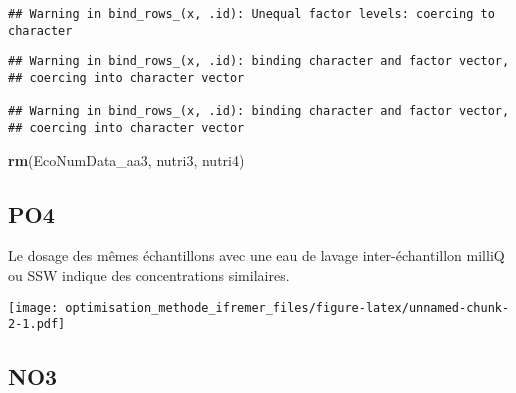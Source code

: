 \documentclass[]{article}
\newenvironment{Shaded}{\begin{snugshade}}{\end{snugshade}}
\newcommand{\KeywordTok}[1]{\textcolor[rgb]{0.13,0.29,0.53}{\textbf{#1}}}
\newcommand{\DataTypeTok}[1]{\textcolor[rgb]{0.13,0.29,0.53}{#1}}
\newcommand{\FloatTok}[1]{\textcolor[rgb]{0.00,0.00,0.81}{#1}}
\newcommand{\CharTok}[1]{\textcolor[rgb]{0.31,0.60,0.02}{#1}}
\newcommand{\StringTok}[1]{\textcolor[rgb]{0.31,0.60,0.02}{#1}}
\newcommand{\OperatorTok}[1]{\textcolor[rgb]{0.81,0.36,0.00}{\textbf{#1}}}
\newcommand{\NormalTok}[1]{#1}
\begin{document}
\begin{verbatim}
## Warning in bind_rows_(x, .id): Unequal factor levels: coercing to character
\end{verbatim}

\begin{verbatim}
## Warning in bind_rows_(x, .id): binding character and factor vector,
## coercing into character vector

## Warning in bind_rows_(x, .id): binding character and factor vector,
## coercing into character vector
\end{verbatim}

\begin{Shaded}
\begin{Highlighting}[]
\KeywordTok{rm}\NormalTok{(EcoNumData_aa3, nutri3, nutri4)}
\end{Highlighting}
\end{Shaded}

\subsection{PO4}\label{po4}

Le dosage des mêmes échantillons avec une eau de lavage
inter-échantillon milliQ ou SSW indique des concentrations similaires.

\begin{Shaded}
\end{Shaded}

\texttt{[image: optimisation\_methode\_ifremer\_files/figure-latex/unnamed-chunk-2-1.pdf]}

\subsection{NO3}\label{no3}
\end{document}
